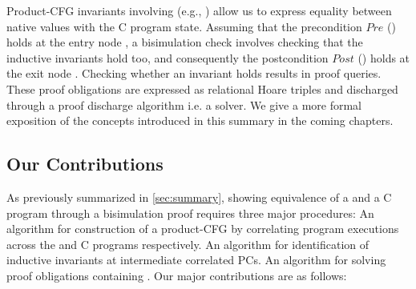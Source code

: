 Product-CFG invariants involving \recursiveRelations{} (e.g., ) allow
us to express equality between native \SpecL{} values with the C program state.
Assuming that the precondition $Pre$ () holds at the entry node ,
a bisimulation check involves checking that the inductive invariants hold too,
and consequently the postcondition $Post$ () holds at the exit node .
Checking whether an invariant holds results in proof queries.
These proof obligations are expressed as relational Hoare triples \cite{relationalHoareLogic,hoareTriple}
and discharged through a proof discharge algorithm i.e. a solver.
We give a more formal exposition of the concepts introduced in this summary in the coming chapters.

\subsection{Our Contributions}
\label{sec:contribs}
As previously summarized in \cref{sec:summary}, showing equivalence of a \SpecL{} and a C program
through a bisimulation proof requires three major procedures:
 An algorithm for construction of a product-CFG by correlating program executions
across the \SpecL{} and C programs respectively.
 An algorithm for identification of inductive invariants at intermediate correlated PCs.
 An algorithm for solving proof obligations containing \recursiveRelations{}.
Our major contributions are as follows:

